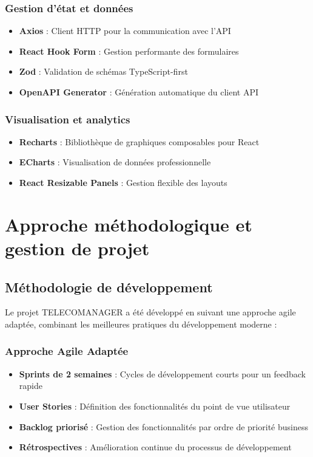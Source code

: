 \documentclass[12pt,a4paper]{report}
\begin{document}
\subsubsection{Gestion d'état et données}
\begin{itemize}
\item \textbf{Axios} : Client HTTP pour la communication avec l'API
\item \textbf{React Hook Form} : Gestion performante des formulaires
\item \textbf{Zod} : Validation de schémas TypeScript-first
\item \textbf{OpenAPI Generator} : Génération automatique du client API
\end{itemize}

\subsubsection{Visualisation et analytics}
\begin{itemize}
\item \textbf{Recharts} : Bibliothèque de graphiques composables pour React
\item \textbf{ECharts} : Visualisation de données professionnelle
\item \textbf{React Resizable Panels} : Gestion flexible des layouts
\end{itemize}

\section{Approche méthodologique et gestion de projet}

\subsection{Méthodologie de développement}

Le projet TELECOMANAGER a été développé en suivant une approche agile adaptée, combinant les meilleures pratiques du développement moderne :

\subsubsection{Approche Agile Adaptée}
\begin{itemize}
\item \textbf{Sprints de 2 semaines} : Cycles de développement courts pour un feedback rapide
\item \textbf{User Stories} : Définition des fonctionnalités du point de vue utilisateur
\item \textbf{Backlog priorisé} : Gestion des fonctionnalités par ordre de priorité business
\item \textbf{Rétrospectives} : Amélioration continue du processus de développement
\end{itemize}
\end{document}
